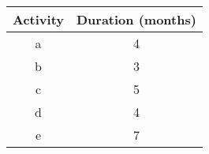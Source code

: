 \begin{tabular}[12pt]{ |c|c| } 
    \hline
    \textbf{Activity} & \textbf{Duration (months)} \\ 
    \hline
    a & 4 \\ 
    \hline 
    b & 3 \\ 
    \hline
    c & 5 \\ 
    \hline   
    d & 4 \\ 
    \hline
    e & 7 \\
    \hline
\end{tabular}
